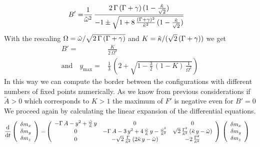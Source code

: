\documentclass{article}
\begin{document}
\begin{align*}
    B'=&\frac{1}{\tilde{\omega}^2}\,\frac{2\,\Gamma\,(\Gamma+\gamma)\,(1-\frac{\tilde{\kappa}}{\sqrt{2}})}{-1\pm\sqrt{1+8\,\frac{(\Gamma+\gamma)^2}{\tilde{\kappa}^2}\,(1-\frac{\tilde{\kappa}}{\sqrt{2}})}}
\end{align*}
With the rescaling $\Omega=\tilde{\omega}/\sqrt{2\,\Gamma\,(\Gamma+\gamma)}$ and $K=\tilde{\kappa}/(\sqrt{2}\,(\Gamma+\gamma))$ we get
\begin{align*}
    B'=&\frac{K}{2\,\Omega^2}\\
    \text{and}\quad y_\text{max}=&\frac{1}{3}\,\left( 2+ \sqrt{1-\frac{3}{2}\,(1-K)\,\frac{1}{\Omega^2}}  \right)
\end{align*}
In this way we can compute the border between the configurations with different numbers of fixed points numerically. As we know from previous considerations if $\tilde{A}>0$ which corresponds to $K>1$ the maximum of $F'$ is negative even for $B'=0$
We proceed again by calculating the linear expansion of the differential equations.
\begin{align*}
    \frac{\text{d}}{\text{d}t}\left(\begin{array}{c}
         \delta m_x\\
         \delta m_y\\
         \delta m_z
    \end{array}\right)=&\left( \begin{array}{ccc}
        -\Gamma\,A-y^2+\frac{\tilde{\omega}}{\tilde{\kappa}}\,y&  0 & 0\\
        0 & -\Gamma\,A-3\,y^2+4\,\frac{\tilde{\omega}}{\tilde{\kappa}}\,y-\frac{\tilde{\omega}^2}{\tilde{\kappa}^2} & \sqrt{2}\,\frac{\Gamma^2}{\tilde{\kappa}^2}\,(\tilde{\kappa}\,y-\tilde{\omega})\\
        0 &  -\sqrt{2}\,\frac{\Gamma}{\tilde{\kappa}^2}\,(2\tilde{\kappa}\,y-\tilde{\omega}) & -2\,\frac{\Gamma^2}{\tilde{\kappa}^2}
    \end{array} \right)\,\left(\begin{array}{c}
         \delta m_x\\
         \delta m_y\\
         \delta m_z
    \end{array}\right)
\end{align*}
\end{document}
